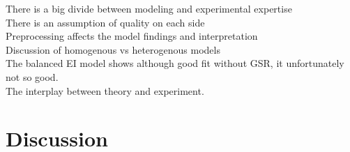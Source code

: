 \documentclass[10pt]{article}
\begin{document}
There is a big divide between modeling and experimental expertise \\
There is an assumption of quality on each side \\
Preprocessing affects the model findings and interpretation \\
Discussion of homogenous vs heterogenous models\\
The balanced EI model shows although good fit without GSR, it unfortunately not so good. \\
The interplay between theory and experiment. \\

\section{Discussion}
\end{document}
